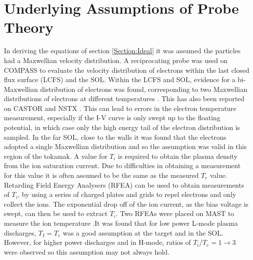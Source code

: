 \section{Underlying Assumptions of Probe Theory}
\label{Section:assumption}
In deriving the equations of section \ref{Section:Ideal} it was assumed the particles had a Maxwellian velocity distribution. A reciprocating probe was used on COMPASS to evaluate the velocity distribution of electrons within the last closed flux surface (LCFS) and the SOL. Within the LCFS and SOL, evidence for a bi-Maxwellian distribution of electrons was found, corresponding to two Maxwellian distributions of electrons at different temperatures \cite{bi-max}. This has also been reported on CASTOR \cite{castor-bi} and NSTX \cite{nstx-bi}. This can lead to errors in the electron temperature measurement, especially if the I-V curve is only swept up to the floating potential, in which case only the high energy tail of the electron distribution is sampled. In the far SOL, close to the walls it was found that the electrons adopted a single Maxwellian distribution and so the assumption was valid in this region of the tokamak.
A value for $T_i$ is required to obtain the plasma density from the ion saturation current. Due to difficulties in obtaining a measurement for this value it is often assumed to be the same as the measured $T_e$ value. Retarding Field Energy Analysers (RFEA) can be used to obtain measurements of $T_i$, by using a series of charged plates and grids to repel electrons and only collect the ions. The exponential drop off of the ion current, as the bias voltage is swept, can then be used to extract $T_i$. Two RFEAs were placed on MAST to measure the ion temperature \cite{sarah}.It was found that for low power L-mode plasma discharges, $T_I = T_e$ was a good assumption at the target and in the SOL. However, for higher power discharges and in H-mode, ratios of $T_i/T_e = 1 \to 3$ were observed so this assumption may not always hold.





